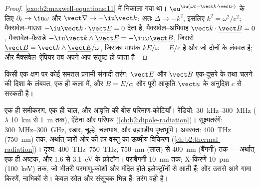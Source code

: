 \begin{proof}
 \cref{exo:b2:maxwell-equations:11} में निकाला गया था।
$\eu^{\iu(\omega t - \vect k\cdot\vect r)}$ के लिए $\partial_t \to \iu\omega$ और $\vect\nabla \to
-\iu\vect k$: अतः $\Delta \to -k^2$, इसलिए $k^2 = \omega^2/c^2$; मैक्सवेल--गाउस $-\iu
\vect k\cdot\underline{\vect E} = 0$ देता है, मैक्सवेल--अभिवाह $\vect k\cdot\underline{\vect B} = 0$,
मैक्सवेल--फ़ैराडे $-\iu\vect k\wedge\underline{\vect E} = -\iu\omega\underline{\vect B}$, जिससे
$\underline{\vect B} = \vect k\wedge\underline{\vect E}/\omega$, जिसका मापांक $kE/\omega = E/c$ है और
जो दोनों के लंबवत है; और मैक्सवेल--ऐंपियर तब अपने आप संतुष्ट हो जाता है।
\end{proof}

\begin{omfigure}

{\small किसी एक क्षण पर कोई समतल प्रगामी संनादी तरंग: $\vect E$ और
$\vect B$ एक-दूसरे के तथा चलने की दिशा के लंबवत, एक ही
कला में, और $B = E/c$; और पूरी आकृति $\vect u$ के अनुदिश $c$ से सरकती है।}
\end{omfigure}

\begin{remark}[वर्णक्रम]\label{rem:b2:plane-waves-polarization:spectrum}
एक ही समीकरण, एक ही चाल, और आवृत्ति की बीस परिमाण-कोटियाँ।
रेडियो: \qty{30}{kHz}--\qty{300}{MHz} ($\lambda$ \qty{10}{km} से \qty{1}{m} तक),
ऐंटेना और परिपथ (\cref{ch:b2:dipole-radiation})। सूक्ष्मतरंगें:
\qty{300}{MHz}--\qty{300}{GHz}, रडार, चूल्हे, चलभाष, और ब्रह्मांडीय
पृष्ठभूमि। अवरक्त: \qty{400}{THz} (\qty{750}{nm}) तक, अर्थात् चारों ओर की हर
वस्तु का ऊष्मीय विकिरण (\cref{ch:b2:thermal-radiation})।
दृश्य: \qty{400}{THz}--\qty{750}{THz}, \qty{750}{nm} (लाल) से \qty{400}{nm}
(बैंगनी) तक --- अर्थात् एक ही अष्टक, और $1.6$ से \qty{3.1}{eV} के फ़ोटॉन। पराबैंगनी
\qty{10}{nm} तक; X-किरणें \qty{10}{pm} (\qty{100}{keV}) तक, जो भीतरी परमाणु-कोशों
और मंदित होते इलेक्ट्रॉनों से आती हैं; और उससे आगे गामा किरणें, नाभिकों से। केवल स्रोत
और संसूचक भिन्न हैं: तरंग वही है।
\end{remark}


